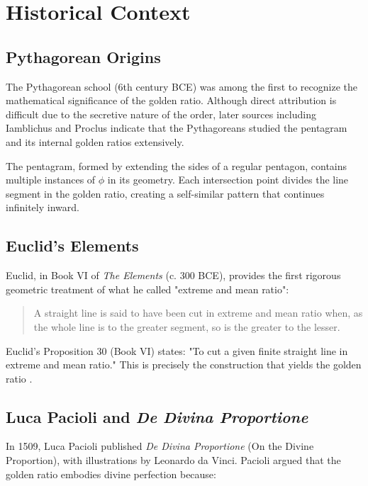\section{Historical Context}

\subsection{Pythagorean Origins}

The Pythagorean school (6th century BCE) was among the first to recognize the mathematical significance of the golden ratio. Although direct attribution is difficult due to the secretive nature of the order, later sources including Iamblichus and Proclus indicate that the Pythagoreans studied the pentagram and its internal golden ratios extensively.

The pentagram, formed by extending the sides of a regular pentagon, contains multiple instances of $\phi$ in its geometry. Each intersection point divides the line segment in the golden ratio, creating a self-similar pattern that continues infinitely inward.

\subsection{Euclid's Elements}

Euclid, in Book VI of \emph{The Elements} (c. 300 BCE), provides the first rigorous geometric treatment of what he called "extreme and mean ratio":

\begin{quote}
A straight line is said to have been cut in extreme and mean ratio when, as the whole line is to the greater segment, so is the greater to the lesser.
\end{quote}

Euclid's Proposition 30 (Book VI) states: "To cut a given finite straight line in extreme and mean ratio." This is precisely the construction that yields the golden ratio \cite{euclid_elements}.

\subsection{Luca Pacioli and \emph{De Divina Proportione}}

In 1509, Luca Pacioli published \emph{De Divina Proportione} (On the Divine Proportion), with illustrations by Leonardo da Vinci. Pacioli argued that the golden ratio embodies divine perfection because:

